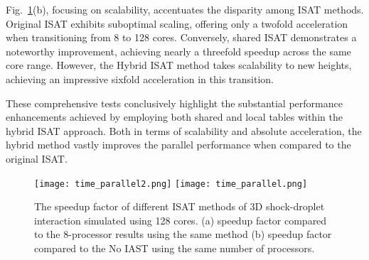 Fig.~\ref{MPI_parallel}(b), focusing on scalability, accentuates the disparity among ISAT methods. Original ISAT exhibits suboptimal scaling, offering only a twofold acceleration when transitioning from 8 to 128 cores. Conversely, shared ISAT demonstrates a noteworthy improvement, achieving nearly a threefold speedup across the same core range. However, the Hybrid ISAT method takes scalability to new heights, achieving an impressive sixfold acceleration in this transition.

These comprehensive tests conclusively highlight the substantial performance enhancements achieved by employing both shared and local tables within the hybrid ISAT approach. Both in terms of scalability and absolute acceleration, the hybrid method vastly improves the parallel performance when compared to the original ISAT.


\begin{figure}[htbp] 
	\centering
	\texttt{[image: time\_parallel2.png]} 
	\texttt{[image: time\_parallel.png]}
	\caption{The speedup factor of different ISAT methods of 3D shock-droplet interaction simulated using 128 cores. (a) speedup factor compared to the 8-processor results using the same method (b) speedup factor compared to the No IAST using the same number of processors. }\label{MPI_parallel} 
\end{figure}
